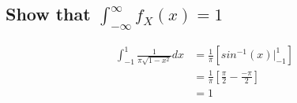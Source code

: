 \documentclass[12pt]{article}
\begin{document}
\subsection*{Show that $\int_{-\infty}^\infty f_X(x) = 1$}
\begin{align*}
  \int_{-1}^1 \frac{1}{\pi\sqrt{1-x^2}}dx 
  &= \frac{1}{\pi}\left[sin^{-1}(x)\big|_{-1}^1\right] \\
  &= \frac{1}{\pi}\left[\frac{\pi}{2} - \frac{-\pi}{2}\right] \\
  &= 1
\end{align*}
\end{document}
